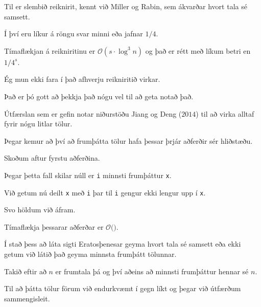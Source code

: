 {
    {
        \item<1-> Til er slembið reiknirit, kennt við Miller og Rabin, sem ákvarðar hvort tala sé samsett.
        \item<2-> Í því eru líkur á röngu svar minni eða jafnar $1/4$.
        \item<3-> Tímaflækjan á reikniritinu er $\mathcal{O}(s \cdot \log^3 n)$ og það er rétt með líkum betri en $1/4^s$.
        \item<4-> Ég mun ekki fara í það afhverju reikniritið virkar.
        \item<5-> Það er þó gott að þekkja það nógu vel til að geta notað það.
        \item<6-> Útfærslan sem er gefin notar niðurstöðu Jiang og Deng ($2014$) til að virka alltaf fyrir nógu litlar tölur.
    }
}

{
}

{
    {
        \item<1-> Þegar kemur að því að frumþátta tölur hafa þessar þrjár aðferðir sér hliðstæðu.
        \item<2-> Skoðum aftur fyrstu aðferðina.
        \item<3->[] 
        \item<4-> Þegar þetta fall skilar núll er \texttt{i} minnsti frumþáttur \texttt{x}.
        \item<5-> Við getum nú deilt \texttt{x} með \texttt{i} þar til \texttt{i} gengur ekki lengur upp í \texttt{x}.
        \item<6-> Svo höldum við áfram.
    }
}

{
    {
        \item<1->[] 
        \item<2-> Tímaflækja þessarar aðferðar er $\mathcal{O}($$)$.
    }
}

{
    {
        \item<1-> Í stað þess að láta sigti Eratosþenesar geyma hvort tala sé samsett eða ekki getum við látið það geyma minnsta frumþátt tölunnar.
        \item<2-> Takið eftir að $n$ er frumtala þá og því aðeins að minnsti frumþáttur hennar sé $n$.
        \item<3-> Til að þátta tölur förum við endurkvæmt í gegn líkt og þegar við útfærðum sammengisleit.
    }
}


